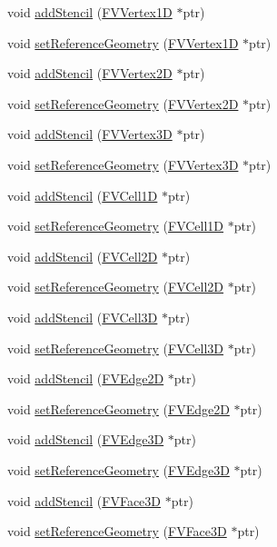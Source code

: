 \begin{DoxyCompactItemize}
void \hyperlink{classFVStencil_af0785e8c3b770acb028b0e71bb7b210e}{addStencil} (\hyperlink{classFVVertex1D}{FVVertex1D} $\ast$ptr)
\item 
void \hyperlink{classFVStencil_a99bceb22726fcc1b5ef089248dcc9166}{setReferenceGeometry} (\hyperlink{classFVVertex1D}{FVVertex1D} $\ast$ptr)
\item 
void \hyperlink{classFVStencil_aab21f08ad1f0558c56004122f2c64f98}{addStencil} (\hyperlink{classFVVertex2D}{FVVertex2D} $\ast$ptr)
\item 
void \hyperlink{classFVStencil_a2a114a8cce549499c9689315b8d2c4cf}{setReferenceGeometry} (\hyperlink{classFVVertex2D}{FVVertex2D} $\ast$ptr)
\item 
void \hyperlink{classFVStencil_ad059e11d270b826f2f01dd90c23fd012}{addStencil} (\hyperlink{classFVVertex3D}{FVVertex3D} $\ast$ptr)
\item 
void \hyperlink{classFVStencil_a61055cf4bb03435a6963051a10772c42}{setReferenceGeometry} (\hyperlink{classFVVertex3D}{FVVertex3D} $\ast$ptr)
\item 
void \hyperlink{classFVStencil_ad840c62f1333c72eb216e66c6e057979}{addStencil} (\hyperlink{classFVCell1D}{FVCell1D} $\ast$ptr)
\item 
void \hyperlink{classFVStencil_a0eabbf88ec0417f4edf00d260630512b}{setReferenceGeometry} (\hyperlink{classFVCell1D}{FVCell1D} $\ast$ptr)
\item 
void \hyperlink{classFVStencil_aa353de8869c3168238441ee2ea022b25}{addStencil} (\hyperlink{classFVCell2D}{FVCell2D} $\ast$ptr)
\item 
void \hyperlink{classFVStencil_a9584ca9b8b12d456a24992af7d9b3502}{setReferenceGeometry} (\hyperlink{classFVCell2D}{FVCell2D} $\ast$ptr)
\item 
void \hyperlink{classFVStencil_a5e51c58a3cd246d5d6c1556f724d0eda}{addStencil} (\hyperlink{classFVCell3D}{FVCell3D} $\ast$ptr)
\item 
void \hyperlink{classFVStencil_ab48ae71ad38034649303834c804501c1}{setReferenceGeometry} (\hyperlink{classFVCell3D}{FVCell3D} $\ast$ptr)
\item 
void \hyperlink{classFVStencil_a8c8c76b8a1c6f6bb79f2db50a3f5e951}{addStencil} (\hyperlink{classFVEdge2D}{FVEdge2D} $\ast$ptr)
\item 
void \hyperlink{classFVStencil_a0dfb63f3f0d2f6a64134c5fd14d56ef3}{setReferenceGeometry} (\hyperlink{classFVEdge2D}{FVEdge2D} $\ast$ptr)
\item 
void \hyperlink{classFVStencil_a4fcafa6a6e90124be6e386eee452c384}{addStencil} (\hyperlink{classFVEdge3D}{FVEdge3D} $\ast$ptr)
\item 
void \hyperlink{classFVStencil_af5c5c9120d56c6948abb0a1fbb4d34b0}{setReferenceGeometry} (\hyperlink{classFVEdge3D}{FVEdge3D} $\ast$ptr)
\item 
void \hyperlink{classFVStencil_a3edafd7e6321ad197b92e2a5e36ab2ab}{addStencil} (\hyperlink{classFVFace3D}{FVFace3D} $\ast$ptr)
\item 
void \hyperlink{classFVStencil_aee6c45898f401346fdaa402792ba4f77}{setReferenceGeometry} (\hyperlink{classFVFace3D}{FVFace3D} $\ast$ptr)
\end{DoxyCompactItemize}


